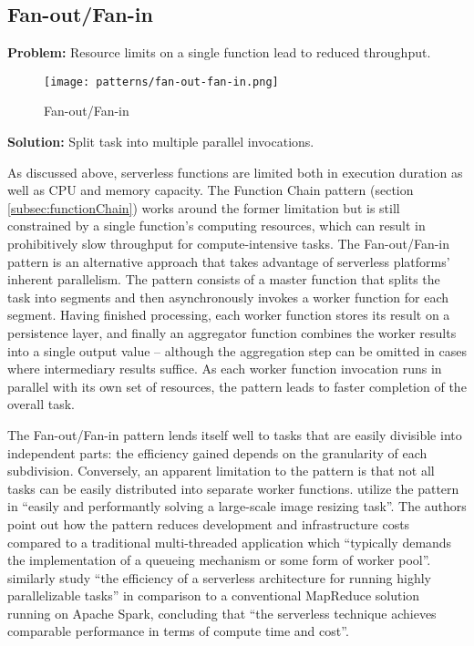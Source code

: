 \subsection{Fan-out/Fan-in} \label{subsec:FanoutFanin}

\textbf{Problem:} Resource limits on a single function lead to reduced throughput.

\begin{figure}[h]
  \centering
  \texttt{[image: patterns/fan-out-fan-in.png]}
  \caption{Fan-out/Fan-in}
  \label{fig:fantOutFanIn}
\end{figure}

\textbf{Solution:} Split task into multiple parallel invocations.

As discussed above, serverless functions are limited both in execution duration as well as CPU and memory capacity. The Function Chain pattern (section \ref{subsec:functionChain}) works around the former limitation but is still constrained by a single function's computing resources, which can result in prohibitively slow throughput for compute-intensive tasks. The Fan-out/Fan-in pattern is an alternative approach that takes advantage of serverless platforms' inherent parallelism. The pattern consists of a master function that splits the task into segments and then asynchronously invokes a worker function for each segment. Having finished processing, each worker function stores its result on a persistence layer, and finally an aggregator function combines the worker results into a single output value -- although the aggregation step can be omitted in cases where intermediary results suffice. As each worker function invocation runs in parallel with its own set of resources, the pattern leads to faster completion of the overall task. \parencite{zambrano18patterns}

The Fan-out/Fan-in pattern lends itself well to tasks that are easily divisible into independent parts: the efficiency gained depends on the granularity of each subdivision. Conversely, an apparent limitation to the pattern is that not all tasks can be easily distributed into separate worker functions. \textcite{mcgrath16cloudEventParadigms} utilize the pattern in ``easily and performantly solving a large-scale image resizing task''. The authors point out how the pattern reduces development and infrastructure costs compared to a traditional multi-threaded application which ``typically demands the implementation of a queueing mechanism or some form of worker pool''. \textcite{lavoie19efficiency} similarly study ``the efficiency of a serverless architecture for running highly parallelizable tasks'' in comparison to a conventional MapReduce solution running on Apache Spark, concluding that ``the serverless technique achieves comparable performance in terms of compute time and cost''.

